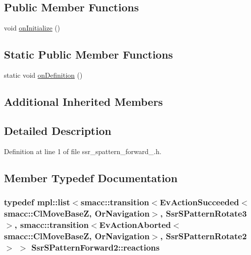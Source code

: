 \subsection*{Public Member Functions}
\begin{DoxyCompactItemize}
\item 
void \hyperlink{structSsrSPatternForward2_a9271aa70005c791d87e03a2b1c02900a}{on\+Initialize} ()
\end{DoxyCompactItemize}
\subsection*{Static Public Member Functions}
\begin{DoxyCompactItemize}
\item 
static void \hyperlink{structSsrSPatternForward2_a9b2bc23e0f05d3f5b5db22cc0489c5a6}{on\+Definition} ()
\end{DoxyCompactItemize}
\subsection*{Additional Inherited Members}


\subsection{Detailed Description}


Definition at line 1 of file ssr\+\_\+spattern\+\_\+forward\+\_.\+h.



\subsection{Member Typedef Documentation}
\subsubsection[{\texorpdfstring{reactions}{reactions}}]{\setlength{\rightskip}{0pt plus 5cm}typedef mpl\+::list$<${\bf smacc\+::transition}$<$Ev\+Action\+Succeeded$<${\bf smacc\+::\+Cl\+Move\+BaseZ}, Or\+Navigation$>$, {\bf Ssr\+S\+Pattern\+Rotate3}$>$, {\bf smacc\+::transition}$<$Ev\+Action\+Aborted$<${\bf smacc\+::\+Cl\+Move\+BaseZ}, Or\+Navigation$>$, {\bf Ssr\+S\+Pattern\+Rotate2}$>$ $>$ {\bf Ssr\+S\+Pattern\+Forward2\+::reactions}}\hypertarget{structSsrSPatternForward2_ae092c11ef4063d966b894e8a6cae33dd}{}\label{structSsrSPatternForward2_ae092c11ef4063d966b894e8a6cae33dd}


